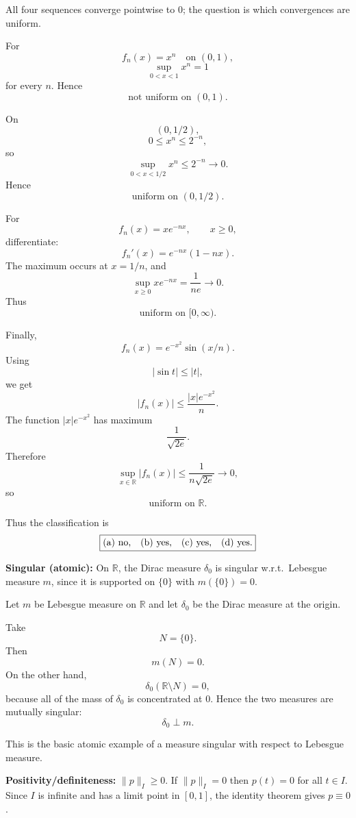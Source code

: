 \begin{solution}
All four sequences converge pointwise to \(0\); the question is which convergences are
uniform.

For
\[
f_n(x)=x^n
\quad\text{on }(0,1),
\]
\[
\sup_{0<x<1}x^n=1
\]
for every \(n\). Hence
\[
\boxed{\text{not uniform on }(0,1).}
\]

On
\[
(0,1/2),
\]
\[
0\le x^n\le2^{-n},
\]
so
\[
\sup_{0<x<1/2}x^n\le2^{-n}\to0.
\]
Hence
\[
\boxed{\text{uniform on }(0,1/2).}
\]

For
\[
f_n(x)=xe^{-nx},
\qquad x\ge0,
\]
differentiate:
\[
f_n'(x)=e^{-nx}(1-nx).
\]
The maximum occurs at \(x=1/n\), and
\[
\sup_{x\ge0}xe^{-nx}
=
\frac1{ne}\to0.
\]
Thus
\[
\boxed{\text{uniform on }[0,\infty).}
\]

Finally,
\[
f_n(x)=e^{-x^2}\sin(x/n).
\]
Using
\[
|\sin t|\le|t|,
\]
we get
\[
|f_n(x)|
\le
\frac{|x|e^{-x^2}}n.
\]
The function \(|x|e^{-x^2}\) has maximum
\[
\frac1{\sqrt{2e}}.
\]
Therefore
\[
\sup_{x\in\mathbb R}|f_n(x)|
\le
\frac1{n\sqrt{2e}}
\to0,
\]
so
\[
\boxed{\text{uniform on }\mathbb R.}
\]

Thus the classification is
\[
\boxed{
\text{(a) no,\quad (b) yes,\quad (c) yes,\quad (d) yes.}
}
\]
\end{solution}


\begin{problem}[CP-II-0039]
\label{prob:cp-ii-0039}
\textbf{Singular (atomic):}
		On $\mathbb R$, the Dirac measure $\delta_0$ is singular w.r.t.\ Lebesgue measure $m$,
		since it is supported on $\{0\}$ with $m(\{0\})=0$.
\end{problem}

\begin{solution}
Let \(m\) be Lebesgue measure on \(\mathbb R\) and let \(\delta_0\) be the Dirac measure at
the origin.

Take
\[
N=\{0\}.
\]
Then
\[
m(N)=0.
\]
On the other hand,
\[
\delta_0(\mathbb R\setminus N)=0,
\]
because all of the mass of \(\delta_0\) is concentrated at \(0\). Hence the two measures are
mutually singular:
\[
\boxed{
\delta_0\perp m.
}
\]

This is the basic atomic example of a measure singular with respect to Lebesgue measure.
\end{solution}


\begin{problem}[CP-II-0040]
\label{prob:cp-ii-0040}
\textbf{Positivity/definiteness:} $\|p\|_{I}\ge0$.
	If $\|p\|_{I}=0$ then $p(t)=0$ for all $t\in I$.
	Since $I$ is infinite and has a limit point in $[0,1]$, the identity theorem gives $p\equiv0$.
\end{problem}

